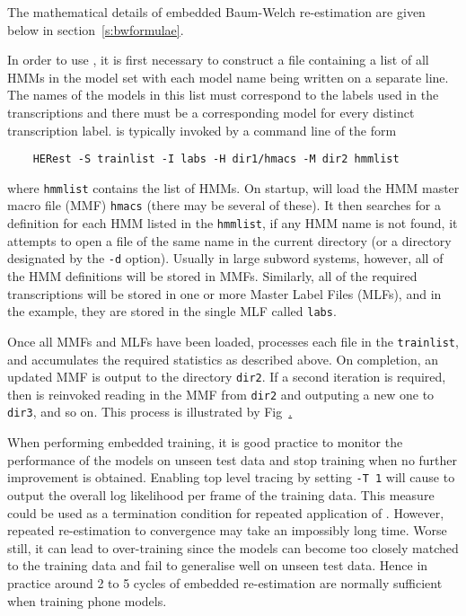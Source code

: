 The mathematical details of embedded Baum-Welch re-estimation
are given below in section~\ref{s:bwformulae}.

In order to use , it is first necessary to construct a 
file containing a list
of all HMMs in the model set with each model name being written on a separate line.
The names of the models in this
list must correspond to the labels used in the transcriptions and there
must be a corresponding model for every distinct transcription label.
 is typically invoked by a command line of the form
\begin{verbatim}
    HERest -S trainlist -I labs -H dir1/hmacs -M dir2 hmmlist
\end{verbatim}
where \texttt{hmmlist} contains the list of HMMs.  On startup,  will 
load the HMM master macro file (MMF) \texttt{hmacs} (there may be
several of these).  It then searches for a definition for each
HMM listed in the \texttt{hmmlist}, if any HMM name is not found, 
it attempts to open a file of the same name in the current directory
(or a directory designated by the \texttt{-d} option).
Usually in large subword systems, however, all of the HMM definitions
will be stored in MMFs.  Similarly, all of the required transcriptions
will be stored in one or more Master Label Files
 (MLFs), and in the
example, they are stored in the single MLF called \texttt{labs}.


Once all MMFs and MLFs have been loaded,  processes each file in the
\texttt{trainlist}, and accumulates the required statistics as described
above.  On completion, an updated  MMF is output to the directory
\texttt{dir2}.  If a second iteration is required, then  is reinvoked
reading in the MMF from \texttt{dir2} and outputing 
a new one to \texttt{dir3}, and so on.
This process is illustrated by Fig~\href{f:herestdp}.

When performing embedded training,  it is good practice to
monitor the performance of the models on unseen test data
and stop training when no further improvement is obtained.  Enabling
top level tracing by setting \texttt{-T 1} will cause  to
output the overall log likelihood per frame of the training data.
This measure could be used as a termination condition for
repeated application of .  However, 
repeated re-estimation to convergence 
may take an impossibly long time.
Worse still, it can lead to over-training since the models can become too
closely matched to the training data and fail to generalise well on unseen
test data.  Hence in practice around 2 to 5 cycles of 
embedded re-estimation are normally sufficient when training phone
models.

